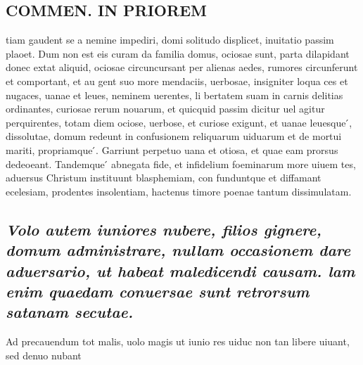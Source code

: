 \documentclass{article}
\begin{document}
\begin{pages}
\section*{COMMEN. IN PRIOREM }
\marginpar{[ p.132 ]}\pstart tiam gaudent se a nemine impediri, domi solitudo displicet, inuitatio passim plaoet. Dum non est eis curam da familia domus, ociosae sunt, parta dilapidant donec extat aliquid, ociosae circuncursant per alienas aedes, rumores circunferunt et comportant, et au gent suo more mendaciis, uerbosae, insigniter loqua ces et nugaces, uanae et leues, neminem uerentes, li bertatem suam in carnis delitias ordinantes, curiosae rerum nouarum, et quicquid passim dicitur uel agitur perquirentes, totam diem ociose, uerbose, et curiose exigunt, et uanae leuesque ́, dissolutae, domum redeunt in confusionem reliquarum uiduarum et de mortui mariti, propriamque ́. Garriunt perpetuo uana et otiosa, et quae eam prorsus dedeoeant. Tandemque ́ abnegata fide, et infidelium foeminarum more uiuem tes, aduersus Christum instituunt blasphemiam, con funduntque et diffamant ecelesiam, prodentes insolentiam, hactenus timore poenae tantum dissimulatam.  \pend
{}
{}
\subsection*{\textit{Volo autem iuniores nubere, filios gignere, domum administrare, nullam occasionem dare aduersario, ut habeat maledicendi causam. lam enim quaedam conuersae sunt retrorsum satanam secutae. }}\pstart Ad precauendum tot malis, uolo magis ut iunio res uiduc non tan libere uiuant, sed denuo nubant  \pend

\end{pages}
\end{document}
